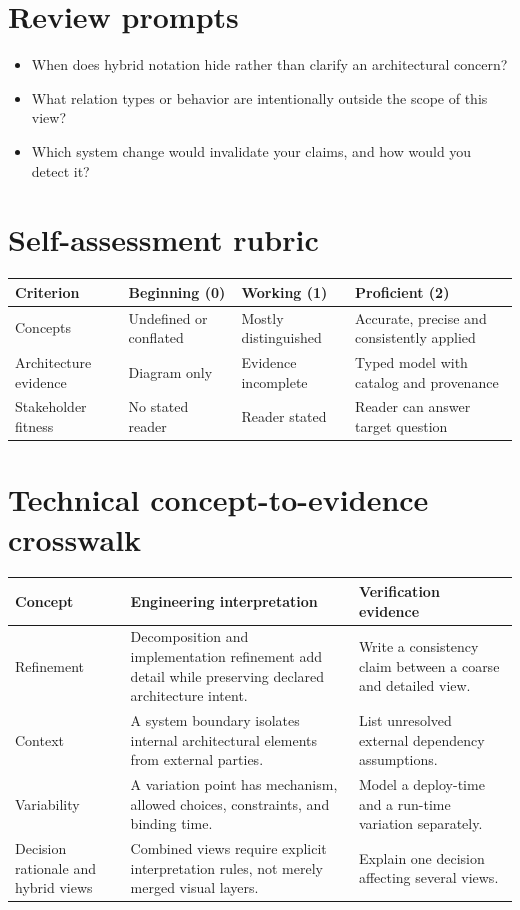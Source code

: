 \documentclass[10pt,letterpaper]{article}
\begin{document}
\section{Review prompts}
\begin{itemize}
\item When does hybrid notation hide rather than clarify an architectural concern?
\item What relation types or behavior are intentionally outside the scope of this view?
\item Which system change would invalidate your claims, and how would you detect it?
\end{itemize}
\section{Self-assessment rubric}
\small
\begin{tabularx}{\linewidth}{@{}YYYY@{}}
\toprule
\textbf{Criterion} & \textbf{Beginning (0)} & \textbf{Working (1)} & \textbf{Proficient (2)} \\
\midrule
Concepts & Undefined or conflated & Mostly distinguished & Accurate, precise and consistently applied \\
Architecture evidence & Diagram only & Evidence incomplete & Typed model with catalog and provenance \\
Stakeholder fitness & No stated reader & Reader stated & Reader can answer target question \\
\bottomrule
\end{tabularx}
\normalsize
\section{Technical concept-to-evidence crosswalk}
\small
\begin{tabularx}{\linewidth}{@{}YYY@{}}
\toprule
\textbf{Concept} & \textbf{Engineering interpretation} & \textbf{Verification evidence} \\
\midrule
Refinement & Decomposition and implementation refinement add detail while preserving declared architecture intent. & Write a consistency claim between a coarse and detailed view. \\
Context & A system boundary isolates internal architectural elements from external parties. & List unresolved external dependency assumptions. \\
Variability & A variation point has mechanism, allowed choices, constraints, and binding time. & Model a deploy-time and a run-time variation separately. \\
Decision rationale and hybrid views & Combined views require explicit interpretation rules, not merely merged visual layers. & Explain one decision affecting several views. \\
\bottomrule
\end{tabularx}
\normalsize
\end{document}
